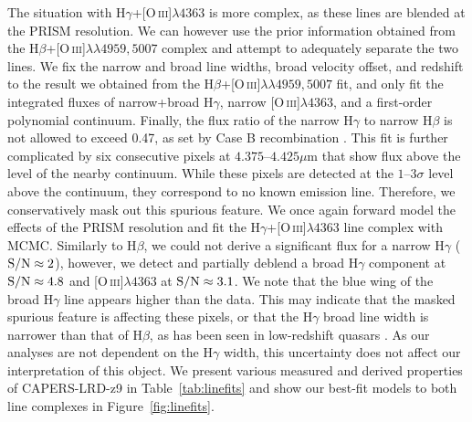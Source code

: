 \documentclass[twocolumn]{aastex7}
\newcommand{\oiii}{[O\,\textsc{iii}]}
\newcommand{\src}{CAPERS-LRD-z9}
\begin{document}
The situation with H$\gamma$+\oiii$\lambda4363$ is more complex, as these lines are blended at the PRISM resolution. We can however use the prior information obtained from the H$\beta$+\oiii$\lambda\lambda4959,5007$ complex and attempt to adequately separate the two lines. We fix the narrow and broad line widths, broad velocity offset, and redshift to the result we obtained from the H$\beta$+\oiii$\lambda\lambda4959,5007$ fit, and only fit the integrated fluxes of narrow+broad H$\gamma$, narrow \oiii$\lambda4363$, and a first-order polynomial continuum. Finally, the flux ratio of the narrow H$\gamma$ to narrow H$\beta$ is not allowed to exceed 0.47, as set by Case B recombination \citep{osterbrock89}. 
This fit is further complicated by six consecutive pixels at $4.375$--$4.425\mu$m that show flux above the level of the nearby continuum. While these pixels are detected at the $1$--$3\sigma$ level above the continuum, they correspond to no known emission line. Therefore, we conservatively mask out this spurious feature. We once again forward model the effects of the PRISM resolution and fit the H$\gamma$+\oiii$\lambda4363$ line complex with MCMC. Similarly to H$\beta$, we could not derive a significant flux for a narrow H$\gamma$ (${\rm S/N}\approx2$), however, we detect and partially deblend a broad H$\gamma$ component at ${\rm S/N}\approx4.8$ and \oiii$\lambda4363$ at ${\rm S/N}\approx3.1$. We note that the blue wing of the broad H$\gamma$ line appears higher than the data.  This may indicate that the masked spurious feature is affecting these pixels, or that the H$\gamma$ broad line width is narrower than that of H$\beta$, as has been seen in low-redshift quasars \citep[e.g.][]{bentz23}. As our analyses are not dependent on the H$\gamma$ width, this uncertainty does not affect our interpretation of this object.  We present various measured and derived properties of \src{} in Table~\ref{tab:linefits} and show our best-fit models to both line complexes in Figure~\ref{fig:linefits}.
\end{document}
